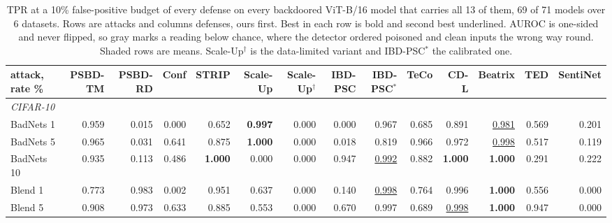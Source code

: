 \begin{table}[htbp]
\centering
\small
\caption{TPR at a 10\% false-positive budget of every defense on every backdoored ViT-B/16 model that carries all 13 of them, 69 of 71 models over 6 datasets. Rows are attacks and columns defenses, ours first. Best in each row is bold and second best underlined. AUROC is one-sided and never flipped, so gray marks a reading below chance, where the detector ordered poisoned and clean inputs the wrong way round. Shaded rows are means. Scale-Up$^\dagger$ is the data-limited variant and IBD-PSC$^\ast$ the calibrated one.}
\label{tab:detectors-tpr10}
\begin{adjustbox}{max width=\textwidth}
\begin{tabular}{lrrrrrrrrrrrrr}
\toprule
attack, rate \% & PSBD-TM & PSBD-RD & Conf & STRIP & Scale-Up & Scale-Up$^\dagger$ & IBD-PSC & IBD-PSC$^\ast$ & TeCo & CD-L & Beatrix & TED & SentiNet \\
\midrule
\multicolumn{14}{l}{\emph{CIFAR-10}} \\
BadNets 1 & 0.959 & \textcolor{black!45}{0.015} & \textcolor{black!45}{0.000} & 0.652 & \textbf{0.997} & \textcolor{black!45}{0.000} & \textcolor{black!45}{0.000} & 0.967 & 0.685 & 0.891 & \underline{0.981} & 0.569 & \textcolor{black!45}{0.201} \\
BadNets 5 & 0.965 & \textcolor{black!45}{0.031} & 0.641 & 0.875 & \textbf{1.000} & \textcolor{black!45}{0.000} & \textcolor{black!45}{0.018} & 0.819 & 0.966 & 0.972 & \underline{0.998} & 0.517 & \textcolor{black!45}{0.119} \\
BadNets 10 & 0.935 & \textcolor{black!45}{0.113} & \textcolor{black!45}{0.486} & \textbf{1.000} & \textcolor{black!45}{0.000} & \textcolor{black!45}{0.000} & 0.947 & \underline{0.992} & 0.882 & \textbf{1.000} & \textbf{1.000} & \textcolor{black!45}{0.291} & \textcolor{black!45}{0.222} \\
Blend 1 & 0.773 & 0.983 & \textcolor{black!45}{0.002} & 0.951 & 0.637 & \textcolor{black!45}{0.000} & \textcolor{black!45}{0.140} & \underline{0.998} & 0.764 & 0.996 & \textbf{1.000} & 0.556 & \textcolor{black!45}{0.000} \\
Blend 5 & 0.908 & 0.973 & 0.633 & 0.885 & 0.553 & \textcolor{black!45}{0.000} & 0.670 & 0.997 & 0.689 & \underline{0.998} & \textbf{1.000} & 0.947 & \textcolor{black!45}{0.000} \\

\end{tabular}
\end{adjustbox}
\end{table}
